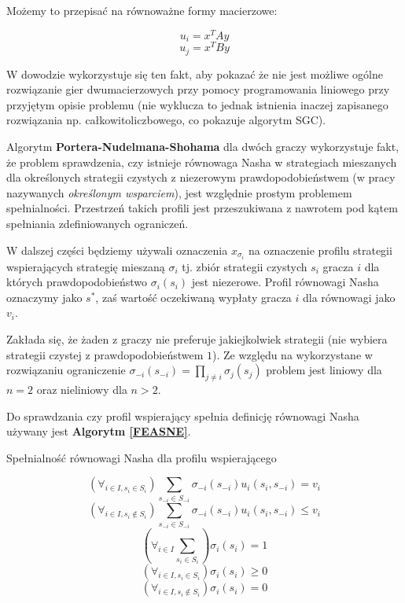 \documentclass[polish]{standalone}
\begin{document}
Możemy to przepisać na równoważne formy macierzowe:

$$u_i = x^{T} A y$$
$$u_j = x^{T} B y$$

W dowodzie wykorzystuje się ten fakt, aby pokazać że nie jest możliwe ogólne rozwiązanie gier dwumacierzowych przy
pomocy programowania liniowego przy przyjętym opisie problemu (nie wyklucza to jednak istnienia inaczej zapisanego
rozwiązania np. całkowitoliczbowego, co pokazuje algorytm SGC).

Algorytm \textbf{Portera-Nudelmana-Shohama} dla dwóch graczy wykorzystuje fakt, że problem sprawdzenia, czy istnieje
równowaga Nasha w strategiach mieszanych dla określonych strategii czystych z niezerowym prawdopodobieństwem (w pracy
nazywanych \textit{określonym wsparciem}), jest względnie prostym problemem spełnialności.
Przestrzeń takich profili jest przeszukiwana z nawrotem pod kątem spełniania zdefiniowanych ograniczeń.

W dalszej części będziemy używali oznaczenia $x_{\sigma_i}$ na oznaczenie profilu strategii wspierających strategię
mieszaną $\sigma_i$ tj. zbiór strategii czystych $s_i$ gracza $i$ dla których prawdopodobieństwo $\sigma_i(s_i)$ jest
niezerowe. Profil równowagi Nasha oznaczymy jako $s^{*}$, zaś wartość oczekiwaną wypłaty gracza $i$ dla równowagi jako
$v_i$.

Zakłada się, że żaden z graczy nie preferuje jakiejkolwiek strategii (nie wybiera strategii czystej z
prawdopodobieństwem $1$). Ze względu na wykorzystane w rozwiązaniu ograniczenie $\sigma_{-i}(s_{-i}) = \prod_{j \ne i}
\sigma_j(s_j)$ problem jest liniowy dla $n = 2$ oraz nieliniowy dla $n > 2$.

Do sprawdzania czy profil wspierający spełnia definicję równowagi Nasha używany jest \textbf{Algorytm \ref{FEASNE}}.
\begin{algorithm}
\caption{Spełnialność równowagi Nasha dla profilu wspierającego}
\label{FEASNE}
\begin{algorithmic}
$$(\forall_{i \in I, s_i \in S_i}) \sum_{s_{-i} \in S_{-i}} \sigma_{-i}(s_{-i}) u_i(s_i, s_{-i}) = v_i$$
$$(\forall_{i \in I, s_i \not\in S_i}) \sum_{s_{-i} \in S_{-i}} \sigma_{-i}(s_{-i}) u_i(s_i, s_{-i}) \leq v_i$$
$$(\forall_{i \in I} \sum_{s_i \in S_i}) \sigma_i(s_i) = 1$$
$$(\forall_{i \in I, s_i \in S_i}) \sigma_i(s_i) \geq 0$$
$$(\forall_{i \in I, s_i \not\in S_i}) \sigma_i(s_i) = 0$$
\end{algorithmic}
\end{algorithm}
\end{document}
